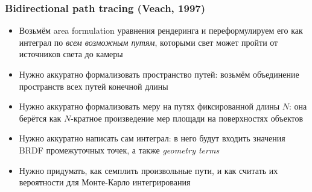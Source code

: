 \documentclass[10pt]{beamer}
\begin{document}
\begin{frame}
\frametitle{Bidirectional path tracing (Veach, 1997)}
\begin{itemize}
\item Возьмём area formulation уравнения рендеринга и переформулируем его как интеграл по \textit{всем возможным путям}, которыми свет может пройти от источников света до камеры
\pause
\item Нужно аккуратно формализовать пространство путей: возьмём объединение пространств всех путей конечной длины
\pause
\item Нужно аккуратно формализовать меру на путях фиксированной длины \begin{math}N\end{math}: она берётся как \begin{math}N\end{math}-кратное произведение мер площади на поверхностях объектов
\pause
\item Нужно аккуратно написать сам интеграл: в него будут входить значения BRDF промежуточных точек, а также \textit{geometry terms}
\pause
\item Нужно придумать, как семплить произвольные пути, и как считать их вероятности для Монте-Карло интегрирования
\end{itemize}
\end{frame}
\end{document}
